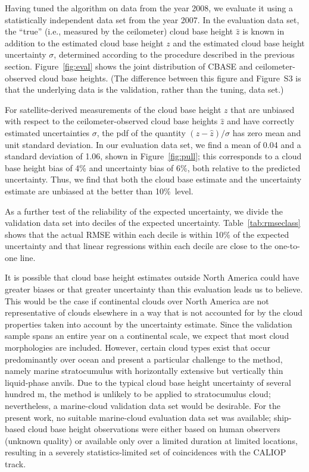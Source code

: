 \documentclass[amt,manuscript]{copernicus}\usepackage[]{graphicx}\usepackage[]{color}
\begin{document}
Having tuned the algorithm on data from the year 2008, we evaluate it using a
statistically independent data set from the year 2007.  In the evaluation data
set, the ``true'' (i.e., measured by the ceilometer) cloud base height $\hat{z}$
is known in addition to the estimated cloud base height $z$ and the estimated
cloud base height uncertainty $\sigma$, determined according to the procedure
described in the previous section.  Figure~\ref{fig:eval} shows the joint
distribution of CBASE and ceilometer-observed cloud base heights.  (The
difference between this figure and Figure~S3 is that the underlying data is the
validation, rather than the tuning, data set.)

For satellite-derived measurements of the cloud base height $z$ that are
unbiased with respect to the ceilometer-observed cloud base heights $\hat{z}$
and have correctly estimated uncertainties $\sigma$, the pdf of the quantity
$(z - \hat{z})/\sigma$ has zero mean and unit standard deviation. In our
evaluation data set, we find a mean of 0.04 and a standard deviation of 1.06, shown in Figure~\ref{fig:pull}; this
corresponds to a cloud base height bias of %
4\%
and uncertainty bias of %
6\%, both relative to the predicted uncertainty.  Thus, we find that both
the cloud base estimate and the uncertainty estimate are unbiased at the better
than 10\%\ level.

As a further test of the reliability of the expected uncertainty, we divide the
validation data set into deciles of the expected uncertainty.
Table~\ref{tab:rmseclass} shows that the actual RMSE within each decile is
within 10\% of the expected uncertainty and that linear regressions within each
decile are close to the one-to-one line.

It is possible that cloud base height estimates outside North America could have
greater biases or that greater uncertainty than this evaluation leads us to
believe.  This would be the case if continental clouds over North America are
not representative of clouds elsewhere in a way that is not accounted for by the
cloud properties taken into account by the uncertainty estimate.  Since the
validation sample spans an entire year on a continental scale, we expect that
most cloud morphologies are included.  However, certain cloud types exist that
occur predominantly over ocean and present a particular challenge to the method,
namely marine stratocumulus with horizontally extensive but vertically thin
liquid-phase anvils.  Due to the typical cloud base height uncertainty of
several hundred m, the method is unlikely to be applied to stratocumulus cloud;
nevertheless, a marine-cloud validation data set would be desirable.  For the
present work, no suitable marine-cloud evaluation data set was available;
ship-based cloud base height observations were either based on human observers
(unknown quality) or available only over a limited duration at limited
locations, resulting in a severely statistics-limited set of coincidences with
the CALIOP track.
\end{document}
